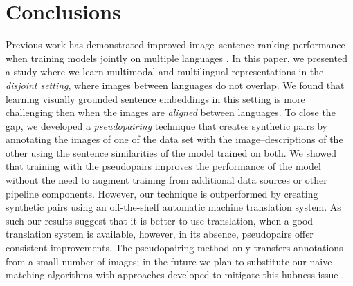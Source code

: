 \section{Conclusions}

Previous work has demonstrated improved image--sentence ranking performance
when training models jointly on multiple languages \cite{D17-1303, kadar2018conll}. In this paper, we presented a study where we learn multimodal
and multilingual representations in the \emph{disjoint setting}, where
images between languages do not overlap.
We found that learning visually grounded sentence embeddings in this
setting is more challenging then when the images are \emph{aligned}
between languages. To close the gap, we developed a \emph{pseudopairing} technique  that creates synthetic pairs by annotating the images
of one of the data set with the image--descriptions of the other using the
sentence similarities of the model trained on both. We showed that 
training with the pseudopairs improves the performance of the model
without the need to augment training from additional data sources or 
other pipeline components. However, our technique is outperformed
by creating synthetic pairs using an off-the-shelf automatic machine translation system. As such our results suggest that it is better to use translation,
when a good translation system is available, however, in its absence, pseudopairs
offer consistent improvements. The pseudopairing method only transfers annotations from a small number of images; in the future we plan to substitute our naive matching algorithms
with approaches developed to mitigate this hubness issue \cite{radovanovic2010existence}.%